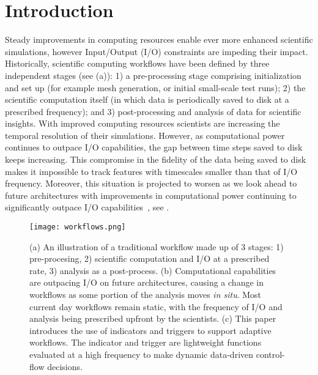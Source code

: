 \documentclass[final]{siamltex}
\begin{document}
\section{Introduction}
Steady improvements in computing resources enable ever more enhanced scientific
simulations, however Input/Output (I/O) constraints are impeding their impact.
Historically, scientific computing workflows have been defined by three 
independent stages (see (a)):  
1) a pre-processing stage comprising 
initialization and set up (for example mesh generation, or
initial small-scale test runs); 2) the scientific computation itself (in which data
is periodically saved to disk at a prescribed frequency); and 3)
post-processing and analysis of data for scientific insights.
With improved computing resources scientists are increasing the temporal resolution of their 
simulations. However, as computational power continues to outpace I/O capabilities, 
the gap between time steps saved to disk keeps increasing. 
This compromise in the fidelity of the data being 
saved to disk makes it impossible to track features with 
timescales smaller than that of I/O frequency. Moreover, this situation is projected to worsen 
as we look ahead to future architectures with improvements in computational power continuing
to significantly outpace I/O capabilities~\cite{doe_arch,dav_exascale}, see
. 

\begin{figure}[tbp] 
   \centering
   \texttt{[image: workflows.png]}\\
   \caption{(a) An illustration of a traditional workflow made up of 3 stages:
   1) pre-procesing, 2) scientific computation and I/O at a prescribed rate, 3)
 analysis as a post-process. (b) Computational capabilities are outpacing I/O
 on future architectures, causing a change in workflows as some portion of the
 analysis moves \emph{in situ}. Most current day workflows remain static, with the frequency of I/O and
 analysis being prescribed upfront by the scientists. (c) This paper introduces
 the use of indicators and triggers to support adaptive workflows.  The
 indicator and trigger are lightweight functions evaluated at a high  frequency
 to make dynamic data-driven control-flow decisions.}
   \label{fig:workflow}
\end{figure}
\end{document}
